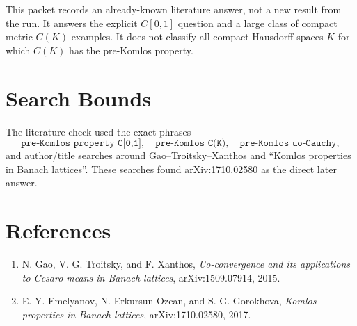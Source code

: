 \documentclass[11pt]{article}
\begin{document}
This packet records an already-known literature answer, not a new result from
the run. It answers the explicit \(C[0,1]\) question and a large class of
compact metric \(C(K)\) examples. It does not classify all compact Hausdorff
spaces \(K\) for which \(C(K)\) has the pre-Komlos property.

\section*{Search Bounds}

The literature check used the exact phrases
\[
\texttt{pre-Komlos property C[0,1]},\quad
\texttt{pre-Komlos C(K)},\quad
\texttt{pre-Komlos uo-Cauchy},
\]
and author/title searches around Gao--Troitsky--Xanthos and ``Komlos
properties in Banach lattices''. These searches found arXiv:1710.02580 as the
direct later answer.

\section*{References}

\begin{enumerate}
\item N. Gao, V. G. Troitsky, and F. Xanthos,
\emph{Uo-convergence and its applications to Cesaro means in Banach lattices},
arXiv:1509.07914, 2015.
\item E. Y. Emelyanov, N. Erkursun-Ozcan, and S. G. Gorokhova,
\emph{Komlos properties in Banach lattices},
arXiv:1710.02580, 2017.
\end{enumerate}
\end{document}
